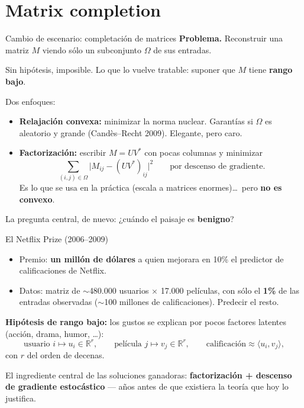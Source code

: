 \documentclass[10pt,aspectratio=169]{beamer}
\newcommand{\R}{\mathbb{R}}
\begin{document}
\section{Matrix completion}

\begin{frame}{Cambio de escenario: completación de matrices}
\textbf{Problema.} Reconstruir una matriz $M$ viendo sólo un subconjunto $\Omega$ de sus entradas.
\medskip

Sin hipótesis, imposible. Lo que lo vuelve tratable: suponer que $M$ tiene \textbf{rango bajo}.
\pause
\medskip

Dos enfoques:
\begin{itemize}
    \item \textbf{Relajación convexa:} minimizar la norma nuclear. Garantías si $\Omega$ es aleatorio y grande (Candès--Recht 2009). Elegante, pero caro.
    \item \textbf{Factorización:} escribir $M = UV^*$ con pocas columnas y minimizar
    \[
    \sum_{(i,j)\in\Omega} \bigl|M_{ij} - (UV^*)_{ij}\bigr|^2
    \qquad \text{por descenso de gradiente.}
    \]
    Es lo que se usa en la práctica (escala a matrices enormes)\dots\ pero \textbf{no es convexo}.
\end{itemize}
\pause
\medskip
La pregunta central, de nuevo: ¿cuándo el paisaje es \textbf{benigno}?
\end{frame}

\begin{frame}{El Netflix Prize (2006--2009)}
\begin{itemize}
    \item Premio: \textbf{un millón de dólares} a quien mejorara en 10\% el predictor de calificaciones de Netflix.
    \item Datos: matriz de $\sim$480.000 usuarios $\times$ 17.000 películas, con sólo el \textbf{1\%} de las entradas observadas ($\sim$100 millones de calificaciones). Predecir el resto.
\end{itemize}
\pause
\medskip
\textbf{Hipótesis de rango bajo:} los gustos se explican por pocos factores latentes (acción, drama, humor, \dots):
\[
\text{usuario } i \mapsto u_i \in \R^r, \qquad
\text{película } j \mapsto v_j \in \R^r, \qquad
\text{calificación} \approx \langle u_i, v_j\rangle,
\]
con $r$ del orden de decenas.
\pause
\medskip

El ingrediente central de las soluciones ganadoras: \textbf{factorización + descenso de gradiente estocástico} --- años antes de que existiera la teoría que hoy lo justifica.
\end{frame}
\end{document}
